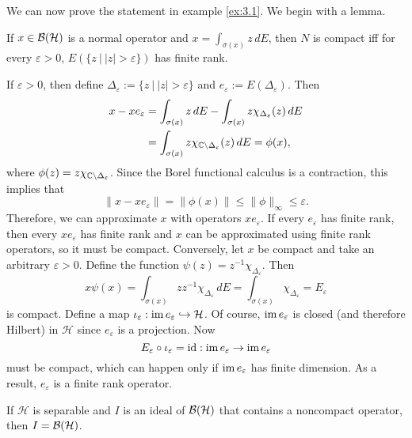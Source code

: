 We can now prove the statement in example \ref{ex:3.1}. We begin with a lemma.

\begin{lemma}
  If $x \in \operatorname{\mathcal{B} (\mathcal{H})}$ is a normal operator and $x = \int_{\sigma(x)} z\, dE$, then $N$ is compact iff for every $\varepsilon > 0$,
  $E(\{z\ |\ |z| > \varepsilon\})$ has finite rank.
\end{lemma}

\begin{myproof}
  If $\varepsilon > 0$, then define $\Delta_{\varepsilon} := \{z\ |\ |z| > \varepsilon\}$ and $e_\varepsilon := E(\Delta_\varepsilon)$.
  Then 
  \begin{align*}
    x - x e_\varepsilon &= \int_{\sigma(x)} z\, dE - \int_{\sigma(x)} z \chi_{\Delta_\varepsilon} (z)\, dE\\
    &= \int_{\sigma(x)} z \chi_{\mathbb {C} \setminus \Delta_\varepsilon} (z)\, dE = \phi (x),
  \end{align*}
  where $\phi (z) = z \chi_{\mathbb {C} \setminus \Delta_{\varepsilon}}$. 
  Since the Borel functional calculus is a contraction, this implies that $$\| x - x e_\varepsilon\| = \| \phi(x)\| \leq \|\phi\|_\infty \leq \varepsilon.$$
  Therefore, we can approximate $x$ with operators $x e_{\varepsilon}$. If every $e_{\varepsilon}$ has finite rank, then every $x e_\varepsilon$
  has finite rank and $x$ can be approximated using finite rank operators, so it must be compact.
  Conversely, let $x$ be compact and take an arbitrary $\varepsilon > 0$. Define the function $\psi (z) = z^{-1} \chi_{\Delta_\varepsilon}$.
  Then $$x \psi (x) = \int_{\sigma(x)} z z^{-1} \chi_{\Delta_\varepsilon} \, dE = \int_{\sigma(x)} \chi_{\Delta_\varepsilon} = E_\varepsilon$$
  is compact. Define a map $\iota_\varepsilon: {\operatorname{im} e_\varepsilon}\hookrightarrow \mathcal{H}$. Of course, $\operatorname{im} e_{\varepsilon}$ is closed (and therefore Hilbert) in $\mathcal{H}$ 
  since $e_\varepsilon$ is a projection.
  Now $$E_{\varepsilon} \circ \iota_\varepsilon = \operatorname{id} : {\operatorname{im} e_\varepsilon} \to {\operatorname{im}e_\varepsilon}$$
  must be compact, which can happen only if ${\operatorname{im} e_\varepsilon}$ has finite dimension. As a result, $e_\varepsilon$ is a finite rank operator.
\end{myproof}

\begin{corollary}\label{cor:6.1}
  If $\mathcal{H}$ is separable and $I$ is an ideal of $\operatorname{\mathcal{B} (\mathcal{H})}$ that contains a noncompact operator, then $I = \operatorname{\mathcal{B} (\mathcal{H})}$.
\end{corollary}

